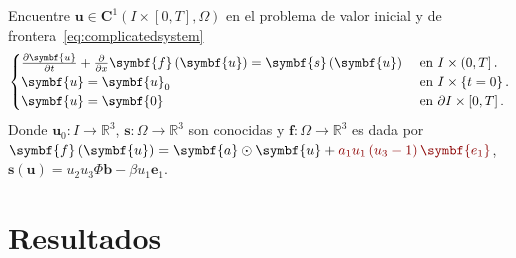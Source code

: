 Encuentre
\begin{math}
	\symbf{u}\in
	\symbf{C}^{1}\left(I\times\left[0,T\right],\Omega\right)
\end{math}
en el problema de valor inicial y de frontera~\eqref{eq:complicatedsystem}
\begin{equation}\label{eq:complicatedsystem}
	\begin{cases}
		\diffp{\symbf{u}}{t}+\diffp{}{x}\symbf{f}\left(\symbf{u}\right)=
		\symbf{s}\left(\symbf{u}\right) & \text{ en }I\times\left(0,T\right].          \\
		\symbf{u}                                                      =
		\symbf{u}_{0}                   & \text{ en }I\times\left\{t=0\right\}.        \\
		\symbf{u}                                                       =
		\symbf{0}                       & \text{ en }\partial I\times\left[0,T\right].
	\end{cases}
\end{equation}
Donde
\begin{math}
	\symbf{u}_{0}\colon I\to
	\mathbb{R}^{3}
\end{math},
\begin{math}
	\symbf{s}\colon\Omega\to
	\mathbb{R}^{3}
\end{math}
son conocidas y
\begin{math}
	\symbf{f}\colon\Omega\to
	\mathbb{R}^{3}
\end{math}
es dada por
\begin{math}
	\symbf{f}\left(\symbf{u}\right)=
	\symbf{a}\odot\symbf{u}+
	\mathcolor{DarkRed}{a_{1}u_{1}\left(u_{3}-1\right)\symbf{e_{1}}}
\end{math},
\begin{math}
	\symbf{s}\left(\symbf{u}\right)=
	u_{2}u_{3}\Phi\symbf{b}-\beta u_{1}\symbf{e}_{1}
\end{math}.

\chapter{Resultados}


